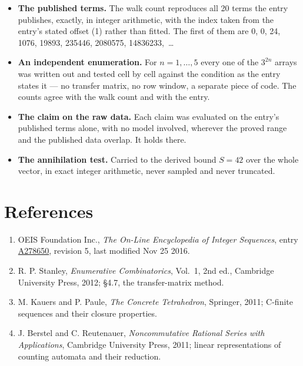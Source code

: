 \documentclass[11pt]{article}
\theoremstyle{definition}
\begin{document}
\begin{itemize}

\item {\bfseries The published terms.} The walk count reproduces all 20 terms the entry publishes, exactly, in integer arithmetic, with the index taken from the entry's stated offset (1) rather than fitted. The first of them are 0, 0, 24, 1076, 19893, 235446, 2080575, 14836233,~\dots

\item {\bfseries An independent enumeration.} For $n = 1,\dots,5$ every one of the $3^{2n}$ arrays was written out and tested cell by cell against the condition as the entry states it --- no transfer matrix, no row window, a separate piece of code. The counts agree with the walk count and with the entry.

\item {\bfseries The claim on the raw data.} Each claim was evaluated on the entry's published terms alone, with no model involved, wherever the proved range and the published data overlap. It holds there.

\item {\bfseries The annihilation test.} Carried to the derived bound $S = 42$ over the whole vector, in exact integer arithmetic, never sampled and never truncated.

\end{itemize}

\section{References}

\begin{enumerate}

\item OEIS Foundation Inc., \emph{The On-Line Encyclopedia of Integer Sequences}, entry \href{https://oeis.org/A278650}{A278650}, revision 5, last modified Nov 25 2016.

\item R. P. Stanley, \emph{Enumerative Combinatorics}, Vol.~1, 2nd ed., Cambridge University Press, 2012; \S4.7, the transfer-matrix method.

\item M. Kauers and P. Paule, \emph{The Concrete Tetrahedron}, Springer, 2011; C-finite sequences and their closure properties.

\item J. Berstel and C. Reutenauer, \emph{Noncommutative Rational Series with Applications}, Cambridge University Press, 2011; linear representations of counting automata and their reduction.

\end{enumerate}
\end{document}
